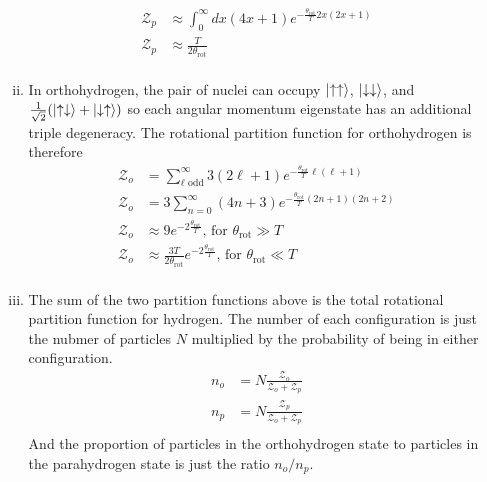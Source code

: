 \documentclass[]{article}
\begin{document}
\begin{enumerate}[1)]
\begin{enumerate}[i.]
\begin{equation}
\begin{split}
\mathcal{Z}_p & \approx \int_{0}^{\infty} dx (4x +1)e^{-\frac{\theta_{\text{rot}}}{T}2x(2x+1)} \\
\mathcal{Z}_p & \approx \frac{T}{2\theta_{\text{rot}}} \\
\end{split}
\end{equation}
\item In orthohydrogen, the pair of nuclei can occupy $\ket{\uparrow\uparrow}$, $\ket{\downarrow\downarrow}$, and $\frac{1}{\sqrt{2}}( \ket{\uparrow\downarrow} + \ket{\downarrow\uparrow} )$ so each angular momentum eigenstate has an additional triple degeneracy. The rotational partition function for orthohydrogen is therefore
\begin{equation}
\begin{split}
\mathcal{Z}_o & = \sum_{\ell \text{ odd}}^{\infty} 3(2\ell +1)e^{-\frac{\theta_{\text{rot}}}{T}\ell(\ell+1)} \\
\mathcal{Z}_o & = 3\sum_{n=0}^{\infty} (4n+3)e^{-\frac{\theta_{\text{rot}}}{T}(2n+1)(2n+2)} \\
\mathcal{Z}_o & \approx 9e^{-2\frac{\theta_{\text{rot}}}{T}} \text{, for }  \theta_{\text{rot}} \gg T\\
\mathcal{Z}_o & \approx \frac{3T}{2\theta_{\text{rot}}}e^{-2\frac{\theta_{\text{rot}}}{T}} \text{, for }  \theta_{\text{rot}} \ll T\\
\end{split}
\end{equation}
\item The sum of the two partition functions above is the total rotational partition function for hydrogen. The number of each configuration is just the nubmer of particles $N$ multiplied by the probability of being in either configuration. \\
\begin{equation}
\begin{split}
n_o & = N \frac{\mathcal{Z}_o}{\mathcal{Z}_o + \mathcal{Z}_p} \\
n_p & = N \frac{\mathcal{Z}_p}{\mathcal{Z}_o + \mathcal{Z}_p} \\
\end{split}
\end{equation}
And the proportion of particles in the orthohydrogen state to particles in the parahydrogen state is just the ratio $n_o/n_p$.
\begin{equation}
\begin{split}

\end{split}
\end{equation}
\end{enumerate}
\end{enumerate}
\end{document}
